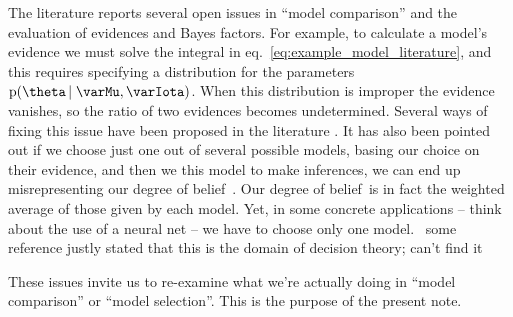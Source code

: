 \documentclass[\ifafour a4paper,12pt,\else a5paper,10pt,\fi%
onecolumn,oneside,article,%
british%
]{memoir}
\theoremstyle{remark}
\theoremstyle{innote}
\newcommand*{\citep}{\parencites}
\newcommand*{\pf}{\mathrm{p}}%
\renewcommand*{\|}{\nonscript\,\vert\nonscript\;\mathopen{}}
\newcommand*{\eqn}{eq.}%
\newcommand*{\puzzle}{\maltese}
\newcommand{\mynote}[1]{ {\color{notecolour}\puzzle\ #1}}
\newcommand*{\dob}{degree of belief}
\newcommand*{\yM}{\varMu}
\newcommand*{\yI}{\varIota}
\newcommand*{\yHm}{\yM}
\begin{document}
The literature reports several open issues in \enquote{model comparison}
and the evaluation of evidences and Bayes factors. For example, to
calculate a model's evidence we must solve the integral in
\eqn~\eqref{eq:example_model_literature}, and this requires specifying a
distribution for the parameters $\pf(\theta \| \yHm, \yI)$. When this
distribution is improper the evidence vanishes, so the ratio of two
evidences becomes undetermined. Several ways of fixing this issue have been
proposed in the literature
\citep{kassetal1995,ohagan1995,bergeretal1996,desantisetal1997,bergeretal1998}.
It has also been pointed out if we choose just one out of several possible
models, basing our choice on their evidence, and then we this model to make
inferences, we can end up misrepresenting our \dob\
\citep{draper1993_r2005,chatfield1995,draper1995,hoetingetal1999}. Our
\dob\ is in fact the weighted average of those given by each model. Yet, in
some concrete applications -- think about the use of a neural net -- we
have to choose only one model. \mynote{some reference justly stated that
  this is the domain of decision theory; can't find it}

These issues invite us to re-examine what we're actually doing in
\enquote{model comparison} or \enquote{model selection}. This is the
purpose of the present note.


\bigskip
\end{document}
